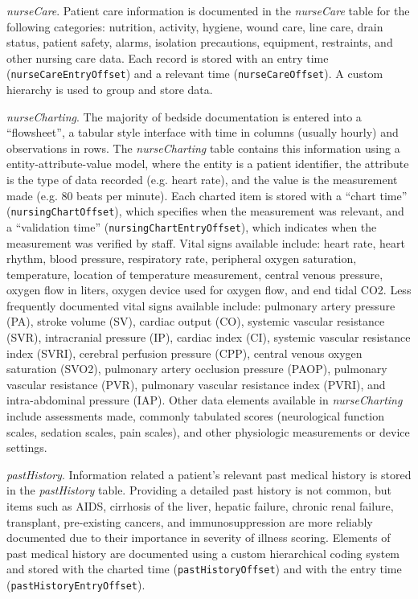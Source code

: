 \documentclass[english]{article}
\newcommand{\colname}[1]{\texttt{#1}}
\newcommand{\tblname}[1]{\emph{#1}}
\begin{document}
\tblname{nurseCare}. Patient care information is documented in the \tblname{nurseCare} table for the following categories: nutrition, activity, hygiene, wound care, line care, drain status, patient safety, alarms, isolation precautions, equipment, restraints, and other nursing care data.
Each record is stored with an entry time (\colname{nurseCareEntryOffset}) and a relevant time (\colname{nurseCareOffset}). A custom hierarchy is used to group and store data.

\tblname{nurseCharting}. The majority of bedside documentation is entered into a ``flowsheet'', a tabular style interface with time in columns (usually hourly) and observations in rows. The \tblname{nurseCharting} table contains this information using a entity-attribute-value model, where the entity is a patient identifier, the attribute is the type of data recorded (e.g. heart rate), and the value is the measurement made (e.g. 80 beats per minute).
Each charted item is stored with a ``chart time'' (\colname{nursingChartOffset}), which specifies when the measurement was relevant, and a ``validation time'' (\colname{nursingChartEntryOffset}), which indicates when the measurement was verified by staff.
Vital signs available include: heart rate, heart rhythm, blood pressure, respiratory rate, peripheral oxygen saturation, temperature, location of temperature measurement, central venous pressure, oxygen flow in liters,  oxygen device used for oxygen flow, and end tidal CO2.
Less frequently documented vital signs available include: pulmonary artery pressure (PA), stroke volume (SV), cardiac output (CO), systemic vascular resistance (SVR), intracranial pressure (IP), cardiac index (CI), systemic vascular resistance index (SVRI), cerebral perfusion pressure (CPP), central venous oxygen saturation (SVO2),  pulmonary artery occlusion pressure (PAOP), pulmonary vascular resistance (PVR), pulmonary vascular resistance index (PVRI), and intra-abdominal pressure (IAP).
Other data elements available in \tblname{nurseCharting} include assessments made, commonly tabulated scores (neurological function scales, sedation scales, pain scales), and other physiologic measurements or device settings.

\tblname{pastHistory}. Information related a patient's relevant past medical history is stored in the \tblname{pastHistory} table.
Providing a detailed past history is not common, but items such as AIDS, cirrhosis of the liver, hepatic failure, chronic renal failure, transplant, pre-existing cancers, and immunosuppression are more reliably documented due to their importance in severity of illness scoring. Elements of past medical history are documented using a custom hierarchical coding system and stored with the charted time (\colname{pastHistoryOffset}) and with the entry time (\colname{pastHistoryEntryOffset}).
\end{document}
